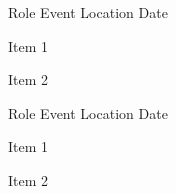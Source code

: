 
\begin{cventries}

  \cventry
    {Role} %
    {Event} %
    {Location} %
    {Date} %
    {
      \begin{cvitems} %
        \item {Item 1}
        \item {Item 2}
      \end{cvitems}
    }

  \cventry
    {Role} %
    {Event} %
    {Location} %
    {Date} %
    {
      \begin{cvitems} %
        \item {Item 1}
        \item {Item 2}
      \end{cvitems}
    }

\end{cventries}
